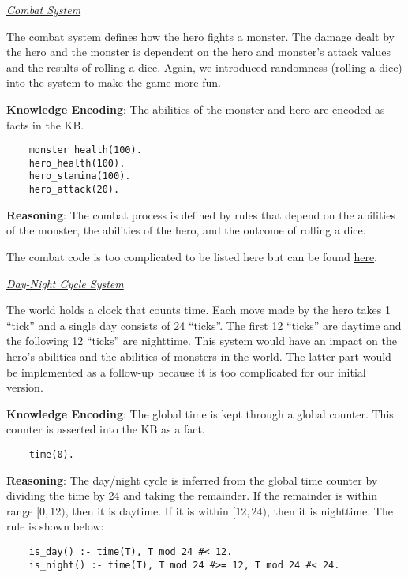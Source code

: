 \documentclass[8pt]{extarticle}
\begin{document}
\begin{multicols*}{2}
\textit{\underline{Combat System}}

The combat system defines how the hero fights a monster. The damage dealt by the hero and the monster is dependent on the hero and monster’s attack values and the results of rolling a dice. Again, we introduced randomness (rolling a dice) into the system to make the game more fun.

\textbf{Knowledge Encoding}: The abilities of the monster and hero are encoded as facts in the KB.

\begin{verbatim}
    monster_health(100).
    hero_health(100).
    hero_stamina(100).
    hero_attack(20).
\end{verbatim}

\textbf{Reasoning}: The combat process is defined by rules that depend on the abilities of the monster, the abilities of the hero, and the outcome of rolling a dice.

The combat code is too complicated to be listed here but can be found \href{https://github.com/lqwk/prolog-adventure/blob/main/src/combat.pl}{here}.


\textit{\underline{Day-Night Cycle System}}

The world holds a clock that counts time. Each move made by the hero takes 1 “tick” and a single day consists of 24 “ticks”. The first 12 “ticks” are daytime and the following 12 “ticks” are nighttime. This system would have an impact on the hero’s abilities and the abilities of monsters in the world. The latter part would be implemented as a follow-up because it is too complicated for our initial version.

\textbf{Knowledge Encoding}: The global time is kept through a global counter. This counter is asserted into the KB as a fact.

\begin{verbatim}
    time(0).
\end{verbatim}

\textbf{Reasoning}: The day/night cycle is inferred from the global time counter by dividing the time by 24 and taking the remainder. If the remainder is within range $[0,12)$, then it is daytime. If it is within $[12,24)$, then it is nighttime. The rule is shown below:

\begin{verbatim}
    is_day() :- time(T), T mod 24 #< 12.
    is_night() :- time(T), T mod 24 #>= 12, T mod 24 #< 24.
\end{verbatim}



\end{multicols*}
\end{document}

